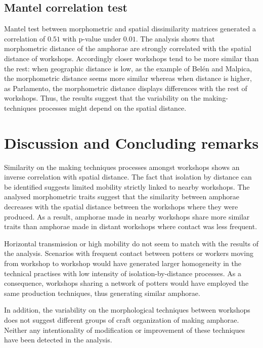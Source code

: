 \documentclass[review]{elsarticle}
\begin{document}
\subsection{Mantel correlation test}

Mantel test between morphometric and spatial dissimilarity matrices generated a correlation of $0.51$ with p-value under $0.01$. The analysis shows that morphometric distance of the amphorae are strongly correlated with the spatial distance of workshops. Accordingly closer workshops tend to be more similar than the rest: when geographic distance is low, as the example of Belén and Malpica, the morphometric distance seems more similar whereas when distance is higher, as Parlamento, the morphometric distance displays differences with the rest of workshops. Thus, the results suggest that the variability on the making-techniques processes might depend on the spatial distance.   

\section{Discussion and Concluding remarks}

Similarity on the making techniques processes amongst workshops shows an inverse correlation with spatial distance. The fact that isolation by distance can be identified suggests limited mobility strictly linked to nearby workshops. The analysed morphometric traits suggest that the similarity between amphorae decreases with the spatial distance between the workshops where they were produced. As a result, amphorae made in nearby workshops share more similar traits than amphorae made in distant workshops where contact was less frequent. 

Horizontal transmission or high mobility do not seem to match with the results of the analysis. Scenarios with frequent contact between potters or workers moving from workshop to workshop would have generated larger homogeneity in the technical practises with low intensity of isolation-by-distance processes. As a consequence, workshops sharing a network of potters would have employed the same production techniques, thus generating similar amphorae. 

In addition, the variability on the morphological techniques between workshops does not suggest different groups of craft organization of making amphorae. Neither any intentionality of modification or improvement of these techniques have been detected in the analysis. 
\end{document}
